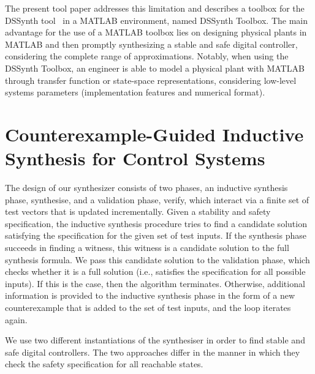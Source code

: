 \documentclass[10pt,conference]{IEEEtran}
\newcommand\tool{{DSSynth Toolbox}\xspace}
\begin{document}
The present tool paper addresses this limitation and describes a toolbox for the DSSynth tool~\cite{abate2017, abatecav2017} 
in a MATLAB environment, named \tool. The main advantage for the use of a MATLAB toolbox 
lies on designing physical plants in MATLAB and then promptly synthesizing a stable and safe digital controller,
considering the complete range of approximations. 
Notably, when using the \tool, an engineer is able to model a physical plant with MATLAB
through transfer function or state-space representations, considering low-level systems parameters 
(implementation features and numerical format).

\section{Counterexample-Guided Inductive Synthesis for Control Systems}



The design of our synthesizer consists of two phases, an inductive
synthesis phase, {\sc synthesise}, and a validation phase, {\sc verify},
which interact via a finite set of test vectors that is updated
incrementally.  Given a stability and safety specification, the
inductive synthesis procedure tries to find a candidate solution
satisfying the specification for the given set of test inputs.
%
If the synthesis phase succeeds in finding a witness, this witness is
a candidate solution to the full synthesis formula.  We pass this
candidate solution to the validation phase, which checks whether it is
a full solution (i.e., satisfies the specification for all possible
inputs).  If this is the case, then the algorithm terminates.
Otherwise, additional information is provided to the inductive
synthesis phase in the form of a new counterexample that is added to
the set of test inputs, and the loop iterates again.

We use two different instantiations of the synthesiser
in order to find stable and safe digital
controllers. The two approaches differ in
the manner in which they check the safety specification
for all reachable states.
\end{document}
